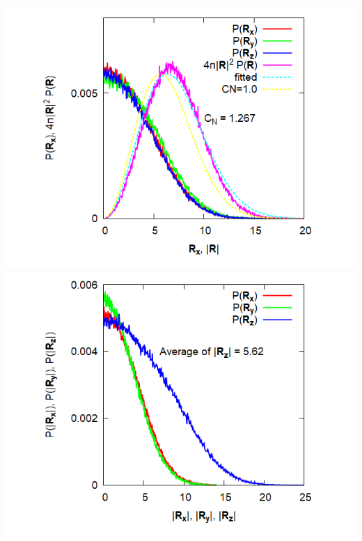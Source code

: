 \documentclass[11pt, dvipdfmx]{beamer}
\begin{document}
\begin{frame}
\begin{columns}[totalwidth=\linewidth]
\includegraphics[width=1.1\columnwidth]{./fig/4chain_E2E_init.png}
\includegraphics[width=1.1\columnwidth]{./fig/Expand_4_Strand_histgram.png}
\end{columns}

\end{frame}
\end{document}
